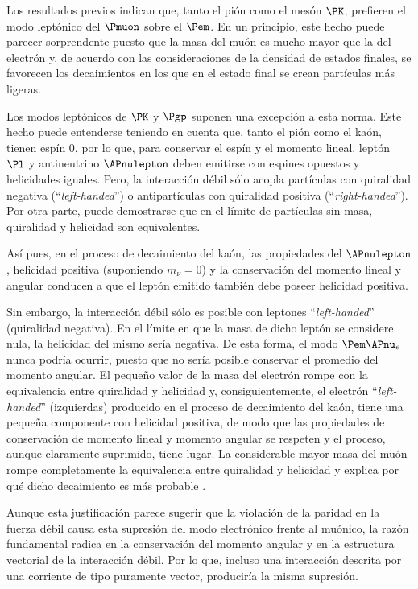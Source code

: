 Los resultados previos indican que, tanto el pión como el mesón $\PK$, prefieren el modo leptónico del $\Pmuon$ sobre el $\Pem$. En un principio, este hecho puede parecer sorprendente puesto que la masa del muón es mucho mayor que la del electrón y, de acuerdo con las consideraciones de la densidad de estados finales, se favorecen los decaimientos en los que en el estado final se crean partículas más ligeras.  

Los modos leptónicos de $\PK$ y $\Pgp$ suponen una excepción a esta norma. Este hecho puede entenderse teniendo en cuenta que, tanto el pión como el kaón, tienen espín 0, por lo que, para conservar el espín y el momento lineal, leptón $\Pl$ y antineutrino $\APnulepton$ deben emitirse con espines opuestos y helicidades iguales. Pero, la interacción débil sólo acopla partículas con quiralidad negativa (``\textit{left-handed}'') o antipartículas con quiralidad positiva (``\textit{right-handed}''). Por otra parte, puede demostrarse que en el límite de partículas sin masa, quiralidad y helicidad son equivalentes.\protect\footnotemark


Así pues, en el proceso de decaimiento del kaón, las propiedades del $\APnulepton$, helicidad positiva (suponiendo $m_{\nu}=0$) y la conservación del momento lineal y angular conducen a que el leptón emitido también debe poseer helicidad positiva.

Sin embargo, la interacción débil sólo es posible con leptones ``\textit{left-handed}'' (quiralidad negativa). En el límite en que la masa de dicho leptón se considere nula, la helicidad del mismo sería negativa. De esta forma, el modo $\Pem \APnu_{e}$ nunca podría ocurrir, puesto que no sería posible conservar el promedio del momento angular. El pequeño valor de la masa del electrón rompe con la equivalencia entre quiralidad y helicidad y, consiguientemente, el electrón ``\textit{left-handed}'' (izquierdas) producido en el proceso de decaimiento del kaón, tiene una pequeña componente con helicidad positiva, de modo que las propiedades de conservación de momento lineal y momento angular se respeten y el proceso, aunque claramente suprimido, tiene lugar. La considerable mayor masa del muón rompe completamente la equivalencia entre quiralidad y helicidad y explica por qué dicho decaimiento es más probable \cite{Griffiths2008} \cite{Halzen}.

Aunque esta justificación parece sugerir que la violación de la paridad en la fuerza débil causa esta supresión del modo electrónico frente al muónico, la razón fundamental radica en la conservación del momento angular y en la estructura vectorial de la interacción débil. Por lo que, incluso una interacción descrita por una corriente de tipo puramente vector, produciría la misma supresión. 


